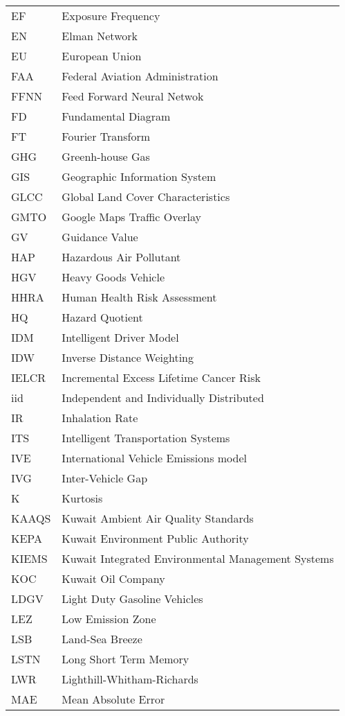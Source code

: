 \begin{longtable}{ll}
EF & Exposure Frequency \\
EN & Elman Network \\
EU & European Union \\
FAA & Federal Aviation Administration \\
FFNN & Feed Forward Neural Netwok \\
FD & Fundamental Diagram \\
FT & Fourier Transform \\
GHG & Greenh-house Gas \\
GIS & Geographic Information System \\
GLCC & Global Land Cover Characteristics \\
GMTO & Google Maps Traffic Overlay \\
GV & Guidance Value \\
HAP & Hazardous Air Pollutant \\
HGV & Heavy Goods Vehicle \\
HHRA & Human Health Risk Assessment \\
HQ & Hazard Quotient \\
IDM & Intelligent Driver Model \\
IDW & Inverse Distance Weighting \\
IELCR & Incremental Excess Lifetime Cancer Risk \\
iid & Independent and Individually Distributed \\
IR & Inhalation Rate \\
ITS & Intelligent Transportation Systems \\
IVE & International Vehicle Emissions model\\
IVG & Inter-Vehicle Gap \\
K & Kurtosis \\
KAAQS & Kuwait Ambient Air Quality Standards \\
KEPA & Kuwait Environment Public Authority \\
KIEMS & Kuwait Integrated Environmental Management Systems \\
KOC & Kuwait Oil Company \\
LDGV & Light Duty Gasoline Vehicles \\
LEZ & Low Emission Zone \\
LSB & Land-Sea Breeze \\
LSTN & Long Short Term Memory \\
LWR & Lighthill-Whitham-Richards \\
MAE & Mean Absolute Error \\

\end{longtable}
